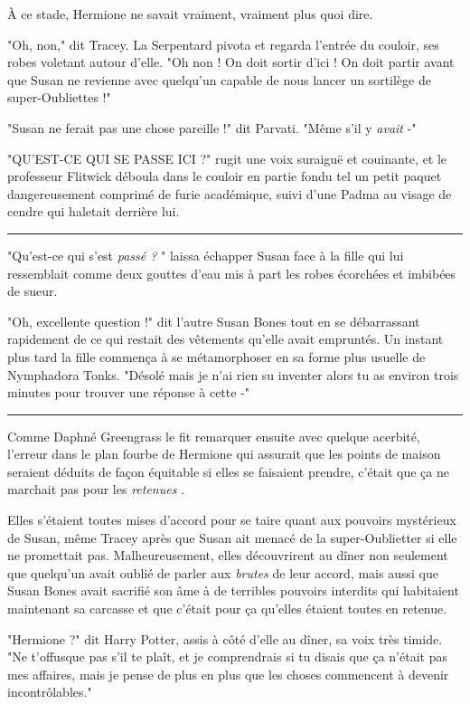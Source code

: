 À ce stade, Hermione ne savait vraiment, vraiment plus quoi dire.

"Oh, non," dit Tracey. La Serpentard pivota et regarda l'entrée du couloir, ses robes voletant autour d'elle. "Oh non ! On doit sortir d'ici ! On doit partir avant que Susan ne revienne avec quelqu'un capable de nous lancer un sortilège de super-Oubliettes !"

"Susan ne ferait pas une chose pareille !" dit Parvati. "Même s'il y \emph{avait}  -"

"QU'EST-CE QUI SE PASSE ICI ?" rugit une voix suraiguë et couinante, et le professeur Flitwick déboula dans le couloir en partie fondu tel un petit paquet dangereusement comprimé de furie académique, suivi d'une Padma au visage de cendre qui haletait derrière lui.
\par\noindent\rule{\textwidth}{0.4pt}
"Qu'est-ce qui s'est \emph{passé ?} " laissa échapper Susan face à la fille qui lui ressemblait comme deux gouttes d'eau mis à part les robes écorchées et imbibées de sueur.

"Oh, excellente question !" dit l'autre Susan Bones tout en se débarrassant rapidement de ce qui restait des vêtements qu'elle avait empruntés. Un instant plus tard la fille commença à se métamorphoser en sa forme plus usuelle de Nymphadora Tonks. "Désolé mais je n'ai rien su inventer alors tu as environ trois minutes pour trouver une réponse à cette -"
\par\noindent\rule{\textwidth}{0.4pt}
Comme Daphné Greengrass le fit remarquer ensuite avec quelque acerbité, l'erreur dans le plan fourbe de Hermione qui assurait que les points de maison seraient déduits de façon équitable si elles se faisaient prendre, c'était que ça ne marchait pas pour les \emph{retenues} .

Elles s'étaient toutes mises d'accord pour se taire quant aux pouvoirs mystérieux de Susan, même Tracey après que Susan ait menacé de la super-Oublietter si elle ne promettait pas. Malheureusement, elles découvrirent au dîner non seulement que quelqu'un avait oublié de parler aux \emph{brutes}  de leur accord, mais aussi que Susan Bones avait sacrifié son âme à de terribles pouvoirs interdits qui habitaient maintenant sa carcasse et que c'était pour ça qu'elles étaient toutes en retenue.

"Hermione ?" dit Harry Potter, assis à côté d'elle au dîner, sa voix très timide. "Ne t'offusque pas s'il te plaît, et je comprendrais si tu disais que ça n'était pas mes affaires, mais je pense de plus en plus que les choses commencent à devenir incontrôlables."


